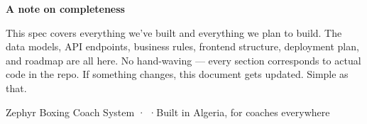 \documentclass[11pt,a4paper]{article}
\begin{document}
\vspace{16pt}

\begin{notebox}
\textbf{A note on completeness}

This spec covers everything we've built and everything we plan to build. The data models, API endpoints, business rules, frontend structure, deployment plan, and roadmap are all here. No hand-waving — every section corresponds to actual code in the repo. If something changes, this document gets updated. Simple as that.
\end{notebox}

\vspace{12pt}
\begin{center}
\small\color{MidGray}
Zephyr Boxing Coach System \quad· \quad·\quad Built in Algeria, for coaches everywhere
\end{center}
\end{document}
